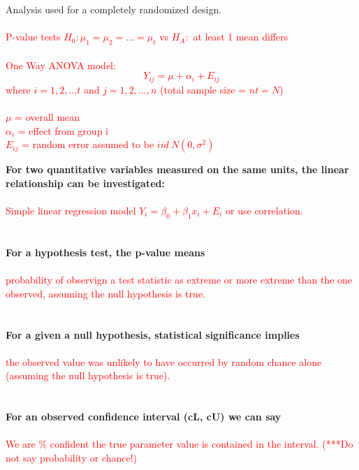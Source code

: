 ~\\~\\Analysis used for a completely randomized design.  \\~\\
\textcolor{red}{P-value tests $H_0: \mu_1=\mu_2=...=\mu_t$ vs $H_A:$ at least 1 mean differs\\~\\
One Way ANOVA model:\\
$$Y_{ij}=\mu+\alpha_i+E_{ij}$$
where $i=1,2,...t$ and $j=1,2,...,n$ (total sample size = $nt=N$)\\~\\
$\mu$ = overall mean\\
$\alpha_i$ = effect from group i\\
 $E_{ij}$ = random error assumed to be $iid~N(0,\sigma^2)$}

\newpage

\large \textbf{For two quantitative variables measured on the same units, the linear relationship can be investigated:}\normalsize\\~\\
\textcolor{red}{Simple linear regression model $Y_i=\beta_0+\beta_1x_i+E_i$ or use correlation.}\\~\\~\\

\large \textbf{For a hypothesis test, the p-value means}\normalsize\\~\\
\textcolor{red}{probability of observign a test statistic as extreme or more extreme than the one observed, assuming the null hypothesis is true.}\\~\\~\\

\large \textbf{For a given a null hypothesis, statistical significance implies}\normalsize\\~\\
\textcolor{red}{the observed value was unlikely to have occurred by random chance alone (assuming the null hypothesis is true).}\\~\\~\\

\large \textbf{For an observed confidence interval (cL, cU) we can say}\normalsize\\~\\
\textcolor{red}{We are \underbar{~~~~~}\% confident the true parameter value is contained in the interval.  (***Do not say probability or chance!)}\\~\\~\\

